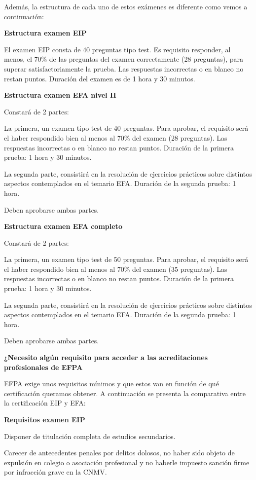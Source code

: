\documentclass[
  letterpaper,
  DIV=11,
  numbers=noendperiod]{scrreprt}
\begin{document}
Además, la estructura de cada uno de estos exámenes es diferente como
vemos a continuación:

\textbf{Estructura examen EIP}

El examen EIP consta de 40 preguntas tipo test. Es requisito responder,
al menos, el 70\% de las preguntas del examen correctamente (28
preguntas), para superar satisfactoriamente la prueba. Las respuestas
incorrectas o en blanco no restan puntos. Duración del examen es de 1
hora y 30 minutos.

\textbf{Estructura examen EFA nivel II}

Constará de 2 partes:

La primera, un examen tipo test de 40 preguntas. Para aprobar, el
requisito será el haber respondido bien al menos al 70\% del examen (28
preguntas). Las respuestas incorrectas o en blanco no restan puntos.
Duración de la primera prueba: 1 hora y 30 minutos.

La segunda parte, consistirá en la resolución de ejercicios prácticos
sobre distintos aspectos contemplados en el temario EFA. Duración de la
segunda prueba: 1 hora.

Deben aprobarse ambas partes.

\textbf{Estructura examen EFA completo}

Constará de 2 partes:

La primera, un examen tipo test de 50 preguntas. Para aprobar, el
requisito será el haber respondido bien al menos al 70\% del examen (35
preguntas). Las respuestas incorrectas o en blanco no restan puntos.
Duración de la primera prueba: 1 hora y 30 minutos.

La segunda parte, consistirá en la resolución de ejercicios prácticos
sobre distintos aspectos contemplados en el temario EFA. Duración de la
segunda prueba: 1 hora.

Deben aprobarse ambas partes.

\textbf{¿Necesito algún requisito para acceder a las acreditaciones
profesionales de EFPA}

EFPA exige unos requisitos mínimos y que estos van en función de qué
certificación queramos obtener. A continuación se presenta la
comparativa entre la certificación EIP y EFA:

\textbf{Requisitos examen EIP}

Disponer de titulación completa de estudios secundarios.

Carecer de antecedentes penales por delitos dolosos, no haber sido
objeto de expulsión en colegio o asociación profesional y no haberle
impuesto sanción firme por infracción grave en la CNMV.
\end{document}

